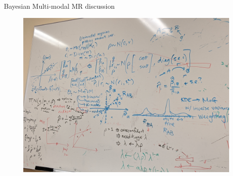 \begin{Minutes}{Bayesian Multi-modal MR discussion}
\begin{figure}[h]
    \label{fig:2}
\end{figure}
\begin{figure}[h]
    \includegraphics[width=.9\textwidth]{figures/whiteboard_20200226_1}
\end{figure}

\end{Minutes}
